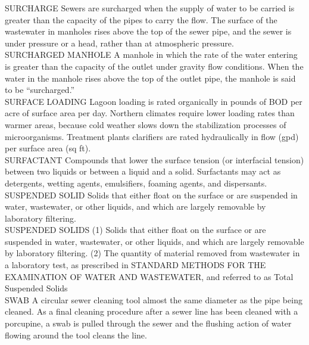 \documentclass{article}
\begin{document}
SURCHARGE
Sewers are surcharged when the supply of water to be carried is greater than the capacity of the pipes to carry the flow. The surface of the wastewater in manholes rises above the top of the sewer pipe, and the sewer is under pressure or a head, rather than at atmospheric pressure. 
\vspace{0.3cm}\\
SURCHARGED MANHOLE
A manhole in which the rate of the water entering is greater than the capacity of the outlet under gravity flow conditions. When the water in the manhole rises above the top of the outlet pipe, the manhole is said to be “surcharged.” 
\vspace{0.3cm}\\
SURFACE LOADING
Lagoon loading is rated organically in pounds of BOD per acre of surface area per day. Northern climates require lower loading rates than warmer areas, because cold weather slows down the stabilization processes of microorganisms. Treatment plants clarifiers are rated hydraulically in flow (gpd) per surface area (sq ft).
\vspace{0.3cm}\\
SURFACTANT
Compounds that lower the surface tension (or interfacial tension) between two liquids or between a liquid and a solid. Surfactants may act as detergents, wetting agents, emulsifiers, foaming agents, and dispersants.
\vspace{0.3cm}\\
SUSPENDED SOLID
Solids that either float on the surface or are suspended in water, wastewater, or other liquids, and which are largely removable by laboratory filtering.
\vspace{0.3cm}\\
SUSPENDED SOLIDS
(1) Solids that either float on the surface or are suspended in water, wastewater, or other liquids, and which are largely removable by laboratory filtering. (2) The quantity of material removed from wastewater in a laboratory test, as prescribed in STANDARD METHODS FOR THE EXAMINATION OF WATER AND WASTEWATER, and referred to as Total Suspended Solids 
\vspace{0.3cm}\\
SWAB
A circular sewer cleaning tool almost the same diameter as the pipe being cleaned. As a final cleaning procedure after a sewer line has been cleaned with a porcupine, a swab is pulled through the sewer and the flushing action of water flowing around the tool cleans the line. 
\vspace{0.3cm}\\
\end{document}
